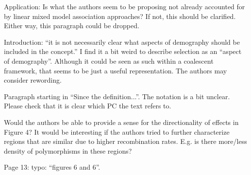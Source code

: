 \begin{point}{Application:}
Is what the authors seem to be proposing not already accounted for by linear
mixed model association approaches? If not, this should be clarified. Either way, this paragraph
could be dropped.
\end{point}


\begin{point}{Introduction:}
 ``it is not necessarily clear what aspects of demography should be included in the
concept.'' I find it a bit weird to describe selection as an ``aspect of demography''. Although it
could be seen as such within a coalescent framework, that seems to be just a useful
representation. The authors may consider rewording.
\end{point}


\begin{point}{}
Paragraph starting in ``Since the definition...''. The notation is a bit unclear. Please check that it
is clear which PC the text refers to.
\end{point}


\begin{point}{}
Would the authors be able to provide a sense for the directionality of effects in Figure 4? It
would be interesting if the authors tried to further characterize regions that are similar due to
higher recombination rates. E.g. is there more/less density of polymorphisms in these regions?
\end{point}


\begin{point}{Page 13:}
typo: ``figures 6 and 6''.
\end{point}

